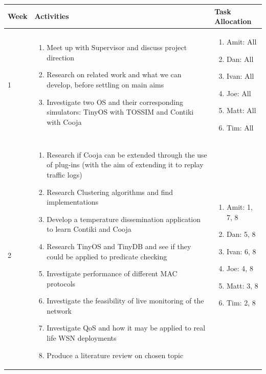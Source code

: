 \begin{center}
	\begin{longtable}{| l | p{9cm} | p{3.5cm} |}
	\hline
	Week & Activities & Task Allocation\\
	\hline
	1 & \begin{enumerate}
			\item Meet up with Supervisor and discuss project direction
			\item Research on related work and what we can develop, before settling on main aims
			\item Investigate two OS and their corresponding simulators: TinyOS with TOSSIM and Contiki with Cooja
		\end{enumerate} &
	\begin{enumerate}
		\item[] Amit: All
		\item[] Dan: All
		\item[] Ivan: All
		\item[] Joe: All
		\item[] Matt: All
		\item[] Tim: All
	\end{enumerate}
	\\ \hline

	2 & \begin{enumerate}
			\item Research if Cooja can be extended through the use of plug-ins (with the aim of extending it to replay traffic logs)
			\item Research Clustering algorithms and find implementations
			\item Develop a temperature dissemination application to learn Contiki and Cooja
			\item Research TinyOS and TinyDB and see if they could be applied to predicate checking
			\item Investigate performance of different MAC protocols
			\item Investigate the feasibility of live monitoring of the network
			\item Investigate QoS and how it may be applied to real life WSN deployments
			\item Produce a literature review on chosen topic
		\end{enumerate} &
	\begin{enumerate}
		\item[] Amit: 1, 7, 8
		\item[] Dan: 5, 8
		\item[] Ivan: 6, 8
		\item[] Joe: 4, 8
		\item[] Matt: 3, 8
		\item[] Tim: 2, 8
	\end{enumerate}
	\\ \hline
	

\end{longtable}
\end{center}
